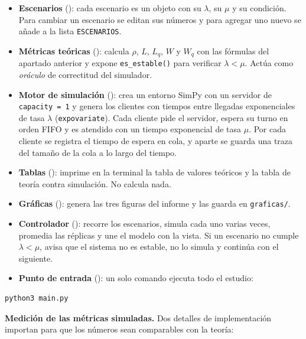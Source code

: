 \documentclass[11pt,a4paper]{article}
\begin{document}
\begin{itemize}
    \item \textbf{Escenarios} (): cada escenario es un
    objeto con su $\lambda$, su $\mu$ y su condición. Para cambiar un escenario se
    editan sus números y para agregar uno nuevo se añade a la lista \texttt{ESCENARIOS}.
    \item \textbf{Métricas teóricas} (): calcula $\rho$, $L$,
    $L_q$, $W$ y $W_q$ con las fórmulas del apartado anterior y expone
    \texttt{es\_estable()} para verificar $\lambda < \mu$. Actúa como \emph{oráculo} de
    correctitud del simulador.
    \item \textbf{Motor de simulación} (): crea un entorno
    SimPy con un servidor de \texttt{capacity = 1} y genera los clientes con tiempos
    entre llegadas exponenciales de tasa $\lambda$ (\texttt{expovariate}). Cada cliente
    pide el servidor, espera su turno en orden FIFO y es atendido con un tiempo
    exponencial de tasa $\mu$. Por cada cliente se registra el tiempo de espera en cola,
    y aparte se guarda una traza del tamaño de la cola a lo largo del tiempo.
    \item \textbf{Tablas} (): imprime en la terminal la tabla de
    valores teóricos y la tabla de teoría contra simulación. No calcula nada.
    \item \textbf{Gráficas} (): genera las tres figuras del
    informe y las guarda en \texttt{graficas/}.
    \item \textbf{Controlador} (): recorre los
    escenarios, simula cada uno varias veces, promedia las réplicas y une el modelo con
    la vista. Si un escenario no cumple $\lambda < \mu$, avisa que el sistema no es
    estable, no lo simula y continúa con el siguiente.
    \item \textbf{Punto de entrada} (): un solo comando ejecuta todo el
    estudio:
\end{itemize}

\begin{verbatim}
python3 main.py
\end{verbatim}

\noindent\textbf{Medición de las métricas simuladas.} Dos detalles de implementación
importan para que los números sean comparables con la teoría:
\end{document}
